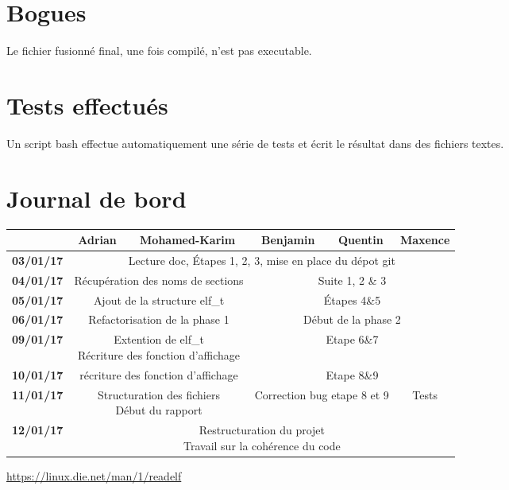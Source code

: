 \documentclass[10pt,oneside]{article}   %
\begin{document}
\section{Bogues}
	Le fichier fusionné final, une fois compilé, n'est pas executable.


\section{Tests effectués}
	Un script bash effectue automatiquement une série de tests et écrit le résultat dans des fichiers textes.

\section{Journal de bord}

	\tabcolsep=0.11cm
	\begin{tabular}{| c || *{4}{c|} c |}
		\hline
		& Adrian & Mohamed-Karim & Benjamin & Quentin & Maxence \\
		\hline
		\bf{03/01/17} & \multicolumn{5}{c|}{Lecture doc, Étapes 1, 2, 3, mise en place du dépot git}\\
		\hline
		\bf{04/01/17} & \multicolumn{2}{c|}{Récupération des noms de sections} & \multicolumn{3}{c|}{Suite 1, 2 \& 3} \\
		\hline
		\bf{05/01/17} & \multicolumn{2}{c|}{Ajout de la structure elf\_t} & \multicolumn{3}{c|}{Étapes 4\&5} \\
		\hline
		\bf{06/01/17} & \multicolumn{2}{c|}{Refactorisation de la phase 1} & \multicolumn{3}{c|}{Début de la phase 2} \\
		\hline
		\bf{09/01/17} & \multicolumn{2}{c|}{\parbox[t]{5cm}{Extention de elf\_t\\Récriture des fonction d'affichage}} & \multicolumn{3}{c|}{Etape 6\&7} \\
		\hline
		\bf{10/01/17} & \multicolumn{2}{c|}{récriture des fonction d'affichage} & \multicolumn{3}{c|}{Etape 8\&9} \\
		\hline
		\bf{11/01/17} & \multicolumn{2}{c|}{\parbox[t]{5cm}{Structuration des fichiers\\ Début du rapport}} & \multicolumn{2}{c|}{Correction bug etape 8 et 9} & Tests\\
		\hline
		\bf{12/01/17} & \multicolumn{5}{c|}{\parbox[t]{5cm}{Restructuration du projet\\Travail sur la cohérence du code} }\\
		\hline
	\end{tabular}

\begin{thebibliography}{9}

\url{https://linux.die.net/man/1/readelf}


\end{thebibliography}
\end{document}

